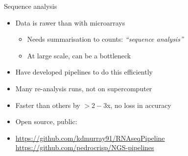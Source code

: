 \documentclass[t]{beamer}
\begin{document}
\begin{frame}{Sequence analysis}
  \begin{itemize}
    \item Data is rawer than with microarrays
    \begin{itemize}
      \item Needs summarisation to counts: \textit{``sequence analysis''}
      \item At large scale, can be a bottleneck
    \end{itemize}
    \pause
    \item Have developed pipelines to do this efficiently
    \pause
    \item Many re-analysis runs, not on supercomputer
    \pause
    \item Faster than others by $>2-3$x, no loss in accuracy
    \pause
    \item Open source, public:
    \item \tiny{\url{https://github.com/kdmurray91/RNAseqPipeline}\\
                \url{https://github.com/pedrocrisp/NGS-pipelines}}
  \end{itemize}
\end{frame}
\end{document}
